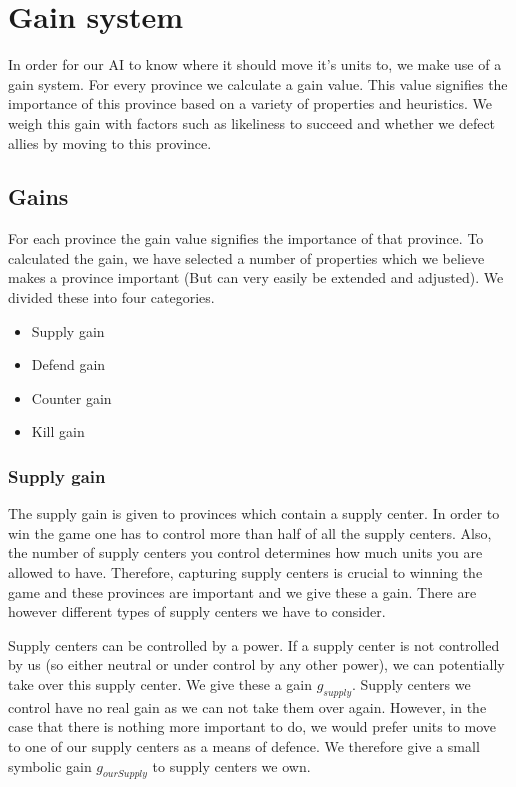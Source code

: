 \documentclass[a4paper]{article} %
\begin{document}
\section{Gain system}

In order for our AI to know where it should move it's units to, we make use of a gain system. For every province we calculate a gain value. This value signifies the importance of this province based on a variety of properties and heuristics. We weigh this gain with factors such as likeliness to succeed and whether we defect allies by moving to this province. 

\subsection{Gains}  

For each province the gain value signifies the importance of that province. To calculated the gain, we have selected a number of properties which we believe makes a province important (But can very easily be extended and adjusted). We divided these into four categories. 

\begin{itemize}
\item Supply gain
\item Defend gain
\item Counter gain
\item Kill gain
\end{itemize}

\subsubsection{Supply gain}

The supply gain is given to provinces which contain a supply center. In order to win the game one has to control more than half of all the supply centers. Also, the number of supply centers you control determines how much units you are allowed to have. Therefore, capturing supply centers is crucial to winning the game and these provinces are important and we give these a gain. There are however different types of supply centers we have to consider. 

Supply centers can be controlled by a power. If a supply center is not controlled by us (so either neutral or under control by any other power), we can potentially take over this supply center. We give these a gain $g_{supply}$. Supply centers we control have no real gain as we can not take them over again. However, in the case that there is nothing more important to do, we would prefer units to move to one of our supply centers as a means of defence. We therefore give a small symbolic gain $g_{ourSupply}$ to supply centers we own. 
\end{document}
